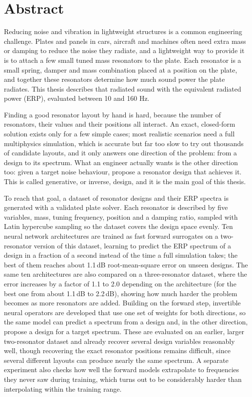 \section*{Abstract}

Reducing noise and vibration in lightweight structures is a common engineering challenge. Plates and panels in cars, aircraft and machines often need extra mass or damping to reduce the noise they radiate, and a lightweight way to provide it is to attach a few small tuned mass resonators to the plate. Each resonator is a small spring, damper and mass combination placed at a position on the plate, and together these resonators determine how much sound power the plate radiates. This thesis describes that radiated sound with the equivalent radiated power (ERP), evaluated between 10 and 160 Hz.

Finding a good resonator layout by hand is hard, because the number of resonators, their values and their positions all interact. An exact, closed-form solution exists only for a few simple cases; most realistic scenarios need a full multiphysics simulation, which is accurate but far too slow to try out thousands of candidate layouts, and it only answers one direction of the problem: from a design to its spectrum. What an engineer actually wants is the other direction too: given a target noise behaviour, propose a resonator design that achieves it. This is called generative, or inverse, design, and it is the main goal of this thesis.

To reach that goal, a dataset of resonator designs and their ERP spectra is generated with a validated plate solver. Each resonator is described by five variables, mass, tuning frequency, position and a damping ratio, sampled with Latin hypercube sampling so the dataset covers the design space evenly. Ten neural network architectures are trained as fast forward surrogates on a two-resonator version of this dataset, learning to predict the ERP spectrum of a design in a fraction of a second instead of the time a full simulation takes; the best of them reaches about 1.1\,dB root-mean-square error on unseen designs. The same ten architectures are also compared on a three-resonator dataset, where the error increases by a factor of 1.1 to 2.0 depending on the architecture (for the best one from about 1.1\,dB to 2.2\,dB), showing how much harder the problem becomes as more resonators are added. Building on the forward step, invertible neural operators are developed that use one set of weights for both directions, so the same model can predict a spectrum from a design and, in the other direction, propose a design for a target spectrum. These are evaluated on an earlier, larger two-resonator dataset and already recover several design variables reasonably well, though recovering the exact resonator positions remains difficult, since several different layouts can produce nearly the same spectrum. A separate experiment also checks how well the forward models extrapolate to frequencies they never saw during training, which turns out to be considerably harder than interpolating within the training range.

\newpage
